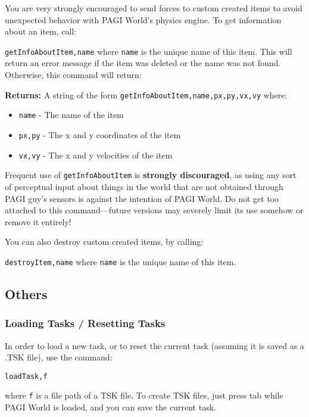 You are very strongly encouraged to send forces to custom created items to avoid unexpected behavior with PAGI World's physics engine. %
To get information about an item, call:

\texttt{getInfoAboutItem,name} where \texttt{name} is the unique name of this item. This will return an error message if the item was deleted or the name was not found. Otherwise, this command will return:

\noindent \textbf{Returns:} A string of the form \texttt{getInfoAboutItem,name,px,py,vx,vy} where:

\begin{itemize}
\item \texttt{name} - The name of the item
\item \texttt{px,py} - The x and y coordinates of the item
\item \texttt{vx,vy} - The x and y velocities of the item
\end{itemize}

Frequent use of \texttt{getInfoAboutItem} is \textbf{strongly discouraged}, as using any sort of perceptual input about things in the world that are not obtained through PAGI guy's sensors is against the intention of PAGI World. Do not get too attached to this command---future versions may severely limit its use somehow or remove it entirely!

You can also destroy custom created items, by calling:

\texttt{destroyItem,name} where \texttt{name} is the unique name of this item. 

\subsection{Others}

\subsubsection{Loading Tasks / Resetting Tasks}

In order to load a new task, or to reset the current task (assuming it is saved as a .TSK file), use the command:

\texttt{loadTask,f}

\noindent where \texttt{f} is a file path of a TSK file. To create TSK files, just press tab while PAGI World is loaded, and you can save the current task.

